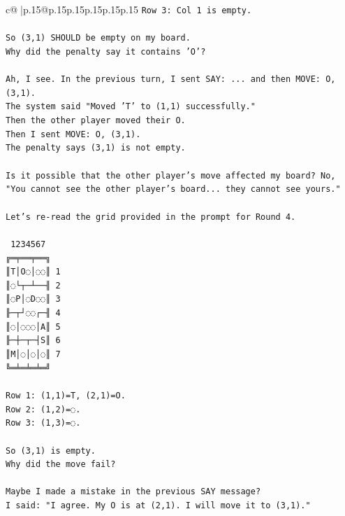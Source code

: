 \documentclass{article}
\begin{document}
{\begin{supertabular}{c@{$\;$}|p{.15\linewidth}@{}p{.15\linewidth}p{.15\linewidth}p{.15\linewidth}p{.15\linewidth}p{.15\linewidth}}
{{{\texttt{Row 3: Col 1 is empty.} \\
\\ 
\texttt{So (3,1) SHOULD be empty on my board.} \\
\texttt{Why did the penalty say it contains 'O'?} \\
\\ 
\texttt{Ah, I see. In the previous turn, I sent SAY: ... and then MOVE: O, (3,1).} \\
\texttt{The system said "Moved 'T' to (1,1) successfully."} \\
\texttt{Then the other player moved their O.} \\
\texttt{Then I sent MOVE: O, (3,1).} \\
\texttt{The penalty says (3,1) is not empty.} \\
\\ 
\texttt{Is it possible that the other player's move affected my board? No, "You cannot see the other player's board... they cannot see yours."} \\
\\ 
\texttt{Let's re{-}read the grid provided in the prompt for Round 4.} \\
\\ 
\texttt{ 1234567} \\
\texttt{╔═╤══╤══╗} \\
\texttt{║T│O◌│◌◌║ 1} \\
\texttt{║◌└┬─┴──╢ 2} \\
\texttt{║◌P│◌D◌◌║ 3} \\
\texttt{╟─┬┘◌◌┌─╢ 4} \\
\texttt{║◌│◌◌◌│A║ 5} \\
\texttt{╟─┼─┬─┤S║ 6} \\
\texttt{║M│◌│◌│◌║ 7} \\
\texttt{╚═╧═╧═╧═╝} \\
\\ 
\texttt{Row 1: (1,1)=T, (2,1)=O.} \\
\texttt{Row 2: (1,2)=◌.} \\
\texttt{Row 3: (1,3)=◌.} \\
\\ 
\texttt{So (3,1) is empty.} \\
\texttt{Why did the move fail?} \\
\\ 
\texttt{Maybe I made a mistake in the previous SAY message?} \\
\texttt{I said: "I agree. My O is at (2,1). I will move it to (3,1)."} \\
}}}
\end{supertabular}}
\end{document}
